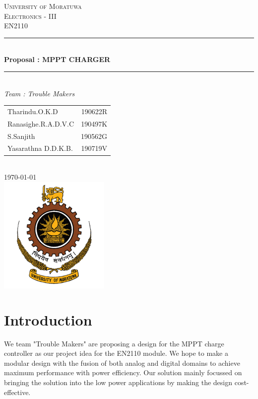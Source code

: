 \documentclass[12pt]{article}
\begin{document}
\begin{titlepage}

    \newcommand{\HRule}{\rule{\linewidth}{0.5mm}} 							%
    \center

    \textsc{\LARGE University of Moratuwa}\\[1cm]

    \textsc{\Large Electronics - III}\\[0.2cm]
    \textsc{\large EN2110}\\[1cm] 										%
    \HRule \\[0.8cm]
    { \huge \bfseries Proposal : MPPT CHARGER}\\[0.7cm]
    \HRule \\[2cm]
    \large
    \emph{\large Team : Trouble Makers}\\
    [0.3cm]
    \begin{tabular}{ l r }
        Tharindu.O.K.D      & 190622R \\
        Ranasighe.R.A.D.V.C & 190497K \\
        S.Sanjith           & 190562G \\
        Yasarathna D.D.K.B. & 190719V \\
    \end{tabular}\\
    [1.5cm]
    {\large \today}\\[2cm]
    \includegraphics[width=0.4\textwidth]{mora.png}\\[1cm] 	%
    \vfill
\end{titlepage}
\section*{Introduction}
We team "Trouble Makers" are proposing a design for the MPPT charge controller as our project idea for the EN2110 module. We hope to make a modular design with the fusion of both analog and digital domains to achieve maximum performance with power efficiency.  Our solution mainly focussed on bringing the solution into the low power applications by making the design cost-effective.
\end{document}
